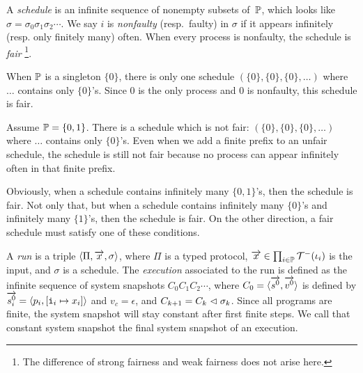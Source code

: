 A \textit{schedule} is an infinite sequence of nonempty subsets
of~$\mathbb{P}$,
which looks like $\sigma = \sigma_0\sigma_1\sigma_2\cdots$.
We say $i$ is \textit{nonfaulty} (resp.~faulty) in
$\sigma$ if it appears infinitely (resp. only finitely many) often.
When every process is nonfaulty, the schedule is \textit{fair}%
\footnote{The difference of strong fairness and weak fairness does not
arise here.  
}.
 \begin{example}
  \label{ex:schedules}
  When $\mathbb{P}$ is a singleton $\{0\}$, there is only one schedule
  $(\{0\},\{0\},\{0\},\ldots)$ where $\ldots$ contains only $\{0\}$'s.
  Since 0 is the only process and 0 is nonfaulty, this schedule is fair.

  Assume $\mathbb{P} = \{0,1\}$.
  There is a schedule which is not fair: $(\{0\}, \{0\}, \{0\}, \ldots)$
  where $\ldots$ contains only $\{0\}$'s.
  Even when we add a finite prefix to an unfair schedule, the schedule
  is still not fair because no process can appear infinitely often in that
  finite prefix.

  Obviously, when a schedule contains infinitely many
  $\{0,1\}$'s, then the schedule is fair.  Not only that, but when a
  schedule contains infinitely many $\{0\}$'s and infinitely many $\{1\}$'s,
  then the schedule is fair.  On the other direction, a fair schedule
  must satisfy one of these conditions.
 \end{example}

A \textit{run} is a triple $\langle{\Pi, \overrightarrow x, \sigma}\rangle$,
where $\Pi$ is a typed protocol,
$\overrightarrow x \in \prod_{i\in \mathbb{P}} \mathcal{T}^-(\iota_i)$ is the input,
and $\sigma$ is a schedule.
The \textit{execution} associated to the run
is defined as the infinite sequence of system snapshots
$C_0C_1C_2\cdots$, where $C_0 = \langle{\overrightarrow{s^0}, \overrightarrow{v^0}}\rangle$ is
defined by $\overrightarrow{s^0_i} = \langle{p_i, [\texttt{i}_i\mapsto x_i]}\rangle$ and
$v_c = \epsilon$, and $C_{k+1} = C_{k}\vartriangleleft\sigma_{k}$.
Since all programs are finite, the system snapshot will stay constant
after first finite steps.  We call that constant system snapshot the
final system snapshot of an execution.


